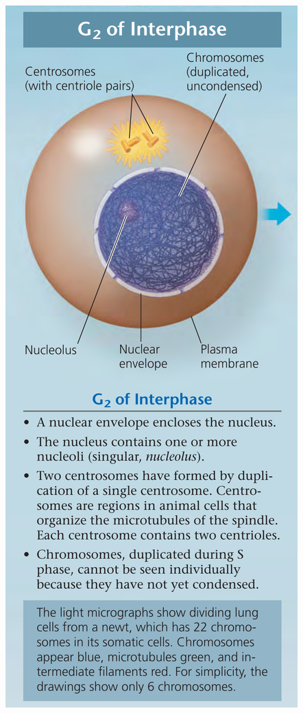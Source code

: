 \documentclass[11pt,ignorenonframetext,aspectratio=169]{beamer}
\begin{document}
\begin{frame}{}
\protect\hypertarget{section-9}{}
\begin{columns}[T,onlytextwidth]
  


\begin{center}\includegraphics[width=0.6\linewidth]{../images/mitosis_animal_cell21} \end{center}

  


\end{columns}
\end{frame}
\end{document}
